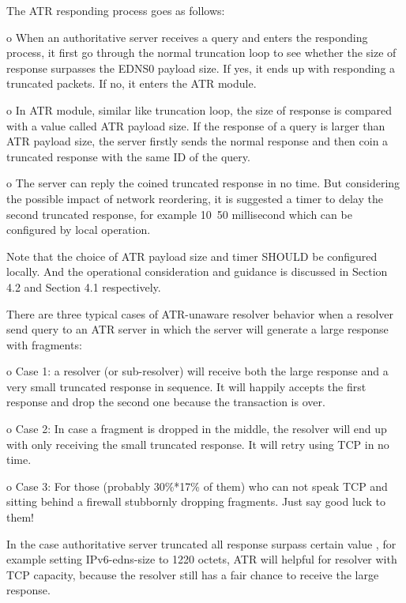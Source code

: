 The ATR responding process goes as follows:

   o  When an authoritative server receives a query and enters the
      responding process, it first go through the normal truncation loop
      to see whether the size of response surpasses the EDNS0 payload
      size.  If yes, it ends up with responding a truncated packets.  If
      no, it enters the ATR module.

   o  In ATR module, similar like truncation loop, the size of response
      is compared with a value called ATR payload size.  If the response
      of a query is larger than ATR payload size, the server firstly
      sends the normal response and then coin a truncated response with
      the same ID of the query.

   o  The server can reply the coined truncated response in no time.
      But considering the possible impact of network reordering, it is
      suggested a timer to delay the second truncated response, for
      example 10~50 millisecond which can be configured by local
      operation.

   Note that the choice of ATR payload size and timer SHOULD be
   configured locally.  And the operational consideration and guidance
   is discussed in Section 4.2 and Section 4.1 respectively.

   There are three typical cases of ATR-unaware resolver behavior when a
   resolver send query to an ATR server in which the server will
   generate a large response with fragments:

   o  Case 1: a resolver (or sub-resolver) will receive both the large
   response and a very small truncated response in sequence.  It will
   happily accepts the first response and drop the second one because
   the transaction is over.

    o  Case 2: In case a fragment is dropped in the middle, the resolver
   will end up with only receiving the small truncated response.  It
   will retry using TCP in no time.

   o  Case 3: For those (probably 30\%*17\% of them) who can not speak TCP
      and sitting behind a firewall stubbornly dropping fragments.  Just
      say good luck to them!


   In the case authoritative server truncated all response surpass
   certain value , for example setting IPv6-edns-size to 1220 octets,
   ATR will helpful for resolver with TCP capacity, because the resolver
   still has a fair chance to receive the large response.

